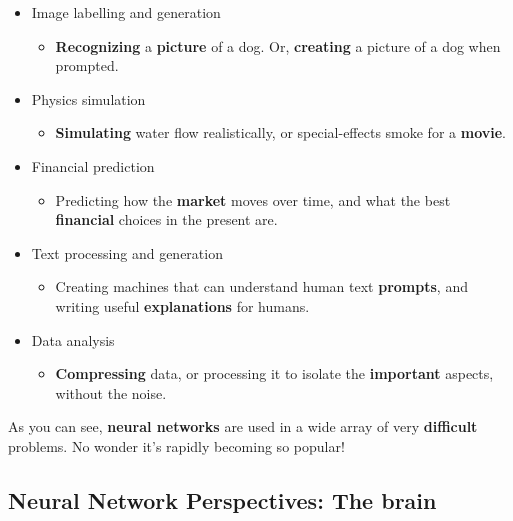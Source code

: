         \begin{itemize}
            \item Image labelling and generation
                \begin{itemize}
                    \item \miniex \textbf{Recognizing} a \textbf{picture} of a dog. Or, \textbf{creating} a picture of a dog when prompted.
                \end{itemize}
            \item Physics simulation
                \begin{itemize}
                    \item \miniex \textbf{Simulating} water flow realistically, or special-effects smoke for a \textbf{movie}.
                \end{itemize}
            \item Financial prediction
                \begin{itemize}
                    \item \miniex Predicting how the \textbf{market} moves over time, and what the best \textbf{financial} choices in the present are.
                \end{itemize}
            \item Text processing and generation
                \begin{itemize}
                    \item \miniex Creating machines that can understand human text \textbf{prompts}, and writing useful \textbf{explanations} for humans.
                \end{itemize}
            \item Data analysis
                \begin{itemize}
                    \item \miniex \textbf{Compressing} data, or processing it to isolate the \textbf{important} aspects, without the noise.
                \end{itemize}
        \end{itemize}
        
        As you can see, \textbf{neural networks} are used in a wide array of very \textbf{difficult} problems. No wonder it's rapidly becoming so popular!
        
    \subsection{Neural Network Perspectives: The brain}
    
